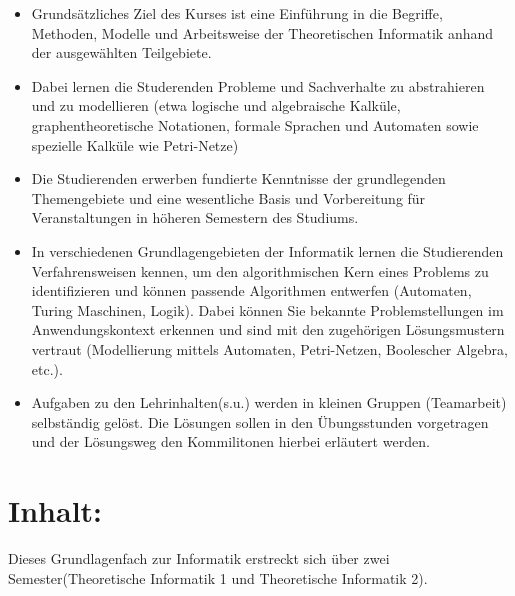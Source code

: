 \begin{itemize}
\item
  Grundsätzliches Ziel des Kurses ist eine Einführung in die Begriffe,
  Methoden, Modelle und Arbeitsweise der Theoretischen Informatik anhand
  der ausgewählten Teilgebiete.
\item
  Dabei lernen die Studerenden Probleme und Sachverhalte zu abstrahieren
  und zu modellieren (etwa logische und algebraische Kalküle,
  graphentheoretische Notationen, formale Sprachen und Automaten sowie
  spezielle Kalküle wie Petri-Netze)
\item
  Die Studierenden erwerben fundierte Kenntnisse der grundlegenden
  Themengebiete und eine wesentliche Basis und Vorbereitung für
  Veranstaltungen in höheren Semestern des Studiums.
\item
  In verschiedenen Grundlagengebieten der Informatik lernen die
  Studierenden Verfahrensweisen kennen, um den algorithmischen Kern
  eines Problems zu identifizieren und können passende Algorithmen
  entwerfen (Automaten, Turing Maschinen, Logik). Dabei können Sie
  bekannte Problemstellungen im Anwendungskontext erkennen und sind mit
  den zugehörigen Lösungsmustern vertraut (Modellierung mittels
  Automaten, Petri-Netzen, Boolescher Algebra, etc.).
\item
  Aufgaben zu den Lehrinhalten(s.u.) werden in kleinen Gruppen
  (Teamarbeit) selbständig gelöst. Die Lösungen sollen in den
  Übungsstunden vorgetragen und der Lösungsweg den Kommilitonen hierbei
  erläutert werden.
\end{itemize}

\section{Inhalt:}\label{inhalt-27}

Dieses Grundlagenfach zur Informatik erstreckt sich über zwei
Semester(Theoretische Informatik 1 und Theoretische Informatik 2).

